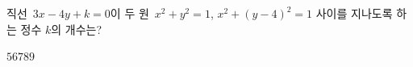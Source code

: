 직선~$3x-4y+k=0$이 두 원~$x^2+y^2=1$, $x^2+(y-4)^2=1$ 사이를 지나도록 하는 정수 $k$의 개수는?
\begin{choices32}{$5$}{$6$}{$7$}{$8$}{$9$}\end{choices32}
